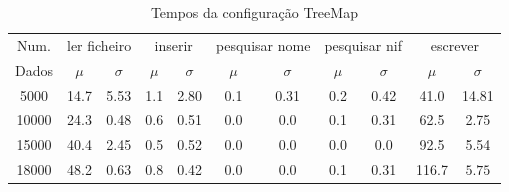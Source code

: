 \documentclass[a5paper,twocolumn, 11pt]{article}
\begin{document}
\clearpage
\onecolumn
    \begin{table}[h!b!t!]
    \begin{center}
    \caption{Tempos da configuração TreeMap}
\begin{tabular}{ | *{11}{c|} }
\hline
    Num. & \multicolumn{2}{|c|}{ler ficheiro} & \multicolumn{2}{|c|}{inserir} & \multicolumn{2}{|c|}{pesquisar nome} & \multicolumn{2}{|c|}{pesquisar nif} & \multicolumn{2}{|c|}{escrever}\\ %
    
    Dados & $\mu$ & $\sigma$ & $\mu$ & $\sigma$ & $\mu$ & $\sigma$ & $\mu$ & $\sigma$ & $\mu$ & $\sigma$\\ \hline
    5000 & 14.7 & 5.53 & 1.1 & 2.80 & 0.1 & 0.31 & 0.2 & 0.42 & 41.0 & 14.81\\ \hline
    10000 & 24.3 & 0.48 & 0.6 & 0.51 & 0.0 & 0.0 & 0.1 & 0.31 & 62.5 & 2.75\\ \hline
    15000 & 40.4 & 2.45 & 0.5 & 0.52 & 0.0 & 0.0 & 0.0 & 0.0 & 92.5 & 5.54\\ \hline
    18000 & 48.2 & 0.63 & 0.8 & 0.42 & 0.0 & 0.0 & 0.1 & 0.31 & 116.7 & $5.75$\\ \hline
    
\end{tabular}
\end{center}
\end{table}
\end{document}
